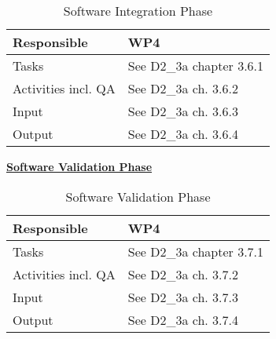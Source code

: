 \documentclass{template/openetcs_article}
\begin{document}
\begin{table}[H]
	\begin{center}
		\begin{supertabular}[H]{|p{6cm}|p{8cm}|}
			\hline
	
			Responsible &
			WP4 \\
			\hline

			Tasks &
			See D2\_3a chapter 3.6.1\\
			\hline
	
			Activities incl. QA &
			See D2\_3a ch. 3.6.2\\
			\hline

			Input &
			See D2\_3a ch. 3.6.3\\
			\hline

			Output &
			See D2\_3a ch. 3.6.4\\ 
			\hline
			
		\end{supertabular}
	\end{center}
	\caption{Software Integration Phase}
\end{table}
\underline{\textbf{Software Validation Phase}}
\begin{table}[H]
	\begin{center}
		\begin{supertabular}[H]{|p{6cm}|p{8cm}|}
			\hline

			Responsible &
			WP4 \\
			\hline

			Tasks &
			See D2\_3a chapter 3.7.1\\
			\hline

			Activities incl. QA &
			See D2\_3a ch. 3.7.2\\
			\hline

			Input &
			See D2\_3a ch. 3.7.3\\
			\hline

			Output &
			See D2\_3a ch. 3.7.4\\ 
			\hline
			
			\end{supertabular}
	\end{center}
	\caption{Software Validation Phase}
\end{table}
\end{document}
